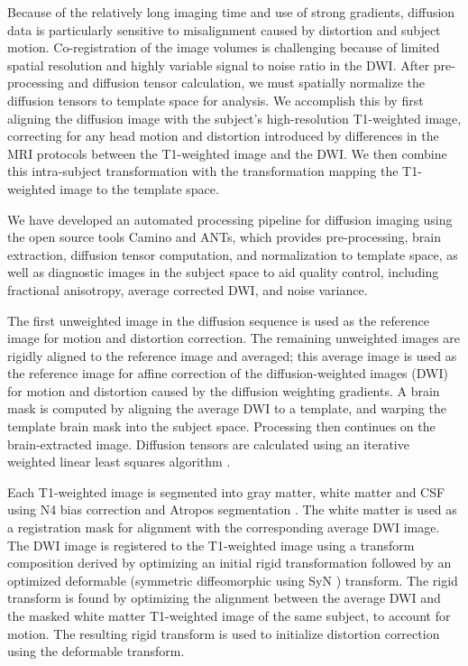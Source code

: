 Because of the relatively long imaging time and use of strong gradients, diffusion data is particularly sensitive to misalignment caused by distortion and subject motion. Co-registration of the image volumes is challenging because of limited spatial resolution and highly variable signal to noise ratio in the DWI. After pre-processing and diffusion tensor calculation, we must spatially normalize the diffusion tensors to template space for analysis. We accomplish this by first aligning the diffusion image with the subject's high-resolution T1-weighted image, correcting for any head motion and distortion introduced by differences in the MRI protocols between the T1-weighted image and the DWI. We then combine this intra-subject transformation with the transformation mapping the T1-weighted image to the template space. 

We have developed an automated processing pipeline for diffusion imaging using the open source tools Camino \cite{Cook2006ISMRM} and ANTs, which provides pre-processing, brain extraction, diffusion tensor computation, and normalization to template space, as well as diagnostic images in the subject space to aid quality control, including fractional anisotropy, average corrected DWI, and noise variance.

The first unweighted image in the diffusion sequence is used as the reference image for motion and distortion correction. The remaining unweighted images are rigidly aligned to the reference image and averaged; this average image is used as the reference image for affine correction of the diffusion-weighted images (DWI) for motion and distortion caused by the diffusion weighting gradients. A brain mask is computed by aligning the average DWI to a template, and warping the template brain mask into the subject space. Processing then continues on the brain-extracted image. Diffusion tensors are calculated using an iterative weighted linear least squares algorithm \cite{Salvador2005HBM}.

Each T1-weighted image is segmented into gray matter, white matter and CSF using N4 bias correction \cite{tustison2010} and Atropos segmentation \cite{Avants2011a}. The white matter is used as a registration mask for alignment with the corresponding average DWI image. The DWI image is registered to the T1-weighted image using a transform composition derived by optimizing an initial rigid transformation followed by an optimized deformable (symmetric diffeomorphic using SyN \cite{Avants2011}) transform. The rigid transform is found by optimizing the alignment between the average DWI and the masked white matter T1-weighted image of the same subject, to account for motion. The resulting rigid transform is used to initialize distortion correction using the deformable transform.

